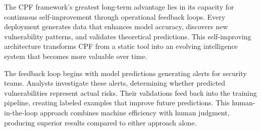 \documentclass[11pt,a4paper]{article}
\begin{document}
The CPF framework's greatest long-term advantage lies in its capacity for continuous self-improvement through operational feedback loops. Every deployment generates data that enhances model accuracy, discovers new vulnerability patterns, and validates theoretical predictions. This self-improving architecture transforms CPF from a static tool into an evolving intelligence system that becomes more valuable over time.

The feedback loop begins with model predictions generating alerts for security teams. Analysts investigate these alerts, determining whether predicted vulnerabilities represent actual risks. Their validations feed back into the training pipeline, creating labeled examples that improve future predictions. This human-in-the-loop approach combines machine efficiency with human judgment, producing superior results compared to either approach alone.
\end{document}
